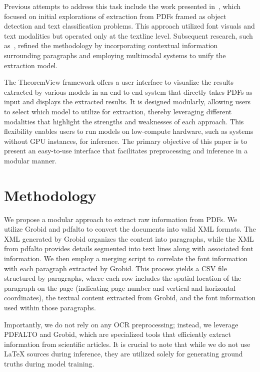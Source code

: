 \documentclass[runningheads]{llncs}
\begin{document}
Previous attempts to address this task include the work presented in~\cite{doceng_paper}, which focused on 
initial explorations of extraction from PDFs framed as object detection and text classification problems. 
This approach utilized font visuals and text modalities but operated only at the textline level. Subsequent 
research, such as~\cite{jcdl_paper}, refined the methodology by incorporating contextual information 
surrounding paragraphs and employing multimodal systems to unify the extraction model.

The TheoremView framework offers a user interface to visualize the results extracted by various models in 
an end-to-end system that directly takes PDFs as input and displays the extracted results. It is designed 
modularly, allowing users to select which model to utilize for extraction, thereby leveraging different 
modalities that highlight the strengths and weaknesses of each approach. This flexibility enables users 
to run models on low-compute hardware, such as systems without GPU instances, for inference. The primary 
objective of this paper is to present an easy-to-use interface that facilitates preprocessing and inference 
in a modular manner.

\section{Methodology}
We propose a modular approach to extract raw information from PDFs. We utilize Grobid \cite{GROBID} and pdfalto \cite{pdfalto} to convert 
the documents into valid XML formats. The XML generated by Grobid organizes the content into paragraphs, 
while the XML from pdfalto provides details segmented into text lines along with associated font information. 
We then employ a merging script to correlate the font information with each paragraph extracted by Grobid. 
This process yields a CSV file structured by paragraphs, where each row includes the spatial location of the 
paragraph on the page (indicating page number and vertical and horizontal coordinates), the textual content 
extracted from Grobid, and the font information used within those paragraphs.

Importantly, we do not rely on any OCR preprocessing; instead, we leverage PDFALTO and Grobid, which are 
specialized tools that efficiently extract information from scientific articles. It is crucial to note that 
while we do not use LaTeX sources during inference, they are utilized solely for generating ground truths 
during model training.
\end{document}
